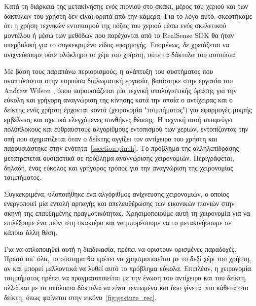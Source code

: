 Κατά τη διάρκεια της μετακίνησης ενός πιονιού στο σκάκι, μέρος του χεριού και των δακτύλων του χρήστη δεν είναι ορατά από την κάμερα. Για το λόγο αυτό, σκεφτήκαμε ότι η χρήση τεχνικών εντοπισμού της πόζας του χεριού μέσω ενός σκελετικού μοντέλου ή μέσω των μεθόδων που παρέχονται από το RealSense\texttrademark{} SDK θα ήταν υπερβολική για το συγκεκριμένο είδος εφαρμογής. Επομένως, δε χρειάζεται να ανιχνεύσουμε ούτε ολόκληρο το χέρι του χρήστη, ούτε τα δάκτυλα του αυτούσια. 



Με βάση τους παραπάνω περιορισμούς, η ανάπτυξη του συστήματος που αναπτύσσεται στην παρούσα διπλωματική εργασία, βασίστηκε στην εργασία του Andrew Wilson \cite{Wilson2006}, όπου παρουσιάζεται μία τεχνική υπολογιστικής όρασης για την εύκολη και γρήγορη αναγνώριση της κίνησης κατά την οποία ο αντίχειρας και ο δείκτης ενός χρήστη έρχονται κοντά (χειρονομία "τσιμπήματος") για εφαρμογές μικρής εμβέλειας και σχετικά ελεγχόμενες συνθήκες θέασης. Η τεχνική αυτή αποφεύγει πολύπλοκους και εύθραυστους αλγορίθμους εντοπισμού των χεριών, εντοπίζοντας την οπή που σχηματίζεται όταν ο δείκτης αγγίζει τον αντίχειρα του χρήστη και παρουσιάστηκε στην ενότητα~\ref{ssection:pinch}. Το πρόβλημα της αλληλεπίδρασης μετατρέπεται ουσιαστικά σε πρόβλημα αναγνώρισης χειρονομιών. Περιγράφεται, δηλαδή, ένας εύκολος και γρήγορος τρόπος για την αναγνώριση της χειρονομίας τσιμπήματος. 


Συγκεκριμένα, υλοποιήθηκε ένα αλγόριθμος ανίχνευσης χειρονομιών, ο οποίος ενεργοποιεί μία εντολή αρπαγής και απελευθέρωσης των εικονικών πιονιών στην σκηνή της επαυξημένης πραγματικότητας. Χρησιμοποιούμε αυτή τη χειρονομία για να επιλέξουμε ένα πιόνι στη σκακιέρα και να μπορέσουμε να το μετακινήσουμε σε κάποια άλλη θέση.


Για να απλοποιηθεί αυτή η διαδικασία, πρέπει να οριστουν ορισμένες παραδοχές.
Πρώτα απ' όλα, το σύστημα θα πρέπει να χρησιμοποιείται με το δεξί χέρι του χρήστη, αν και μπορεί μελλοντικά να λυθεί αυτό το πρόβλημα εύκολα. Επιπλέον, η χειρονομία τσιμπήματος πρέπει να πραγματοποιείται με την ένωση του αντίχειρα και του δείκτη, αλλά και με τα υπόλοιπα δάκτυλα να είναι τεντωμένα και όσο γίνεται πιο κάθετα στο δείκτη, όπως φαίνεται στην εικόνα~\ref{fig:gesture_rec}.


